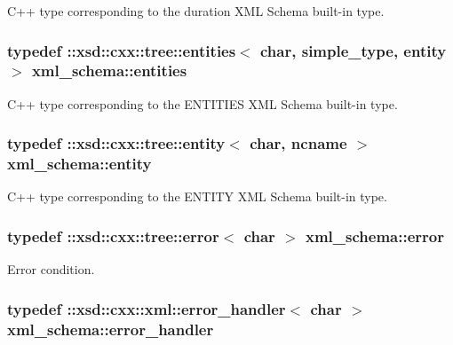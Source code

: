 C++ type corresponding to the duration X\+M\+L Schema built-\/in type. 

\hypertarget{namespacexml__schema_ad9a0d0d60ff45d5f4a4086a502b9599b}{}
\subsubsection[{entities}]{\setlength{\rightskip}{0pt plus 5cm}typedef \+::xsd\+::cxx\+::tree\+::entities$<$ char, {\bf simple\+\_\+type}, {\bf entity} $>$ {\bf xml\+\_\+schema\+::entities}}\label{namespacexml__schema_ad9a0d0d60ff45d5f4a4086a502b9599b}


C++ type corresponding to the E\+N\+T\+I\+T\+I\+E\+S X\+M\+L Schema built-\/in type. 

\hypertarget{namespacexml__schema_a871d3ae7ead81c6fc7ff7d37cd5f4c8f}{}
\subsubsection[{entity}]{\setlength{\rightskip}{0pt plus 5cm}typedef \+::xsd\+::cxx\+::tree\+::entity$<$ char, {\bf ncname} $>$ {\bf xml\+\_\+schema\+::entity}}\label{namespacexml__schema_a871d3ae7ead81c6fc7ff7d37cd5f4c8f}


C++ type corresponding to the E\+N\+T\+I\+T\+Y X\+M\+L Schema built-\/in type. 

\hypertarget{namespacexml__schema_a13e2122658f2abee3c2da9829f2de129}{}
\subsubsection[{error}]{\setlength{\rightskip}{0pt plus 5cm}typedef \+::xsd\+::cxx\+::tree\+::error$<$ char $>$ {\bf xml\+\_\+schema\+::error}}\label{namespacexml__schema_a13e2122658f2abee3c2da9829f2de129}


Error condition. 

\hypertarget{namespacexml__schema_abdee01986b8e16f04af47dd12038261e}{}
\subsubsection[{error\+\_\+handler}]{\setlength{\rightskip}{0pt plus 5cm}typedef \+::xsd\+::cxx\+::xml\+::error\+\_\+handler$<$ char $>$ {\bf xml\+\_\+schema\+::error\+\_\+handler}}\label{namespacexml__schema_abdee01986b8e16f04af47dd12038261e}


